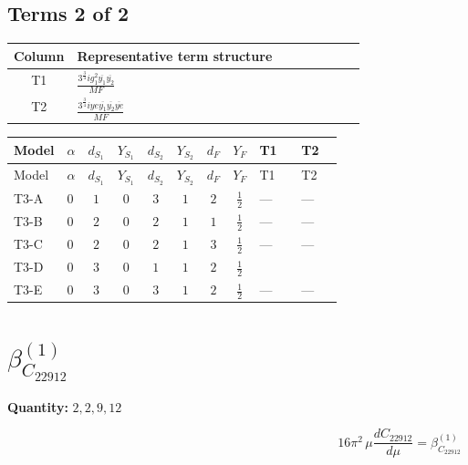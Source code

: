 \documentclass[8pt]{article}
\begin{document}
\begin{landscape}
\subsection*{Terms 2 of 2}
\begin{center}
\begin{tabular}{@{}c >{\raggedright\arraybackslash}p{0.82\linewidth}@{}}
\toprule
Column & Representative term structure \\
\midrule
T1 & \(\displaystyle \frac{3^{\frac{3}{4}} i g_{1}^{2} \overline{y_{1}} \overline{y_{2}}}{MF}\) \\
\midrule
T2 & \(\displaystyle \frac{3^{\frac{3}{4}} i ye \overline{y_{1}} \overline{y_{2}} \overline{ye}}{MF}\) \\
\midrule
\bottomrule
\end{tabular}
\end{center}
\smallskip
\tiny
\begin{longtable}{@{}llcccccc >{\raggedright\arraybackslash}p{0.21\linewidth} >{\raggedright\arraybackslash}p{0.21\linewidth}@{}}
\toprule
Model & $\alpha$ & $d_{S_1}$ & $Y_{S_1}$ & $d_{S_2}$ & $Y_{S_2}$ & $d_F$ & $Y_F$ & T1 & T2 \\
\midrule
\endfirsthead
\toprule
Model & $\alpha$ & $d_{S_1}$ & $Y_{S_1}$ & $d_{S_2}$ & $Y_{S_2}$ & $d_F$ & $Y_F$ & T1 & T2 \\
\midrule
\endhead
T3-A & $0$ & $1$ & $0$ & $3$ & $1$ & $2$ & $\frac{1}{2}$ & --- & --- \\
\midrule
T3-B & $0$ & $2$ & $0$ & $2$ & $1$ & $1$ & $\frac{1}{2}$ & --- & --- \\
\midrule
T3-C & $0$ & $2$ & $0$ & $2$ & $1$ & $3$ & $\frac{1}{2}$ & --- & --- \\
\midrule
T3-D & $0$ & $3$ & $0$ & $1$ & $1$ & $2$ & $\frac{1}{2}$ & \scriptsize\adjustbox{max width=\linewidth}{$\begin{gathered} - \frac{3^{\frac{3}{4}} i g_{1}^{2} \overline{y_{1}} \overline{y_{2}}}{8 MF}\end{gathered}$} & \scriptsize\adjustbox{max width=\linewidth}{$\begin{gathered} \frac{3^{\frac{3}{4}} i ye \overline{y_{1}} \overline{y_{2}} \overline{ye}}{12 MF}\end{gathered}$} \\
\midrule
T3-E & $0$ & $3$ & $0$ & $3$ & $1$ & $2$ & $\frac{1}{2}$ & --- & --- \\
\midrule
\bottomrule
\end{longtable}
\clearpage
\section*{$\beta_{C_{22912}}^{(1)}$}
\noindent\textbf{Quantity: }$\mathrm{2,2,9,12}$\par\smallskip
\[16\pi^2\,\mu\frac{d C_{22912}}{d\mu}=\beta_{C_{22912}}^{(1)}\]

\end{landscape}
\end{document}
